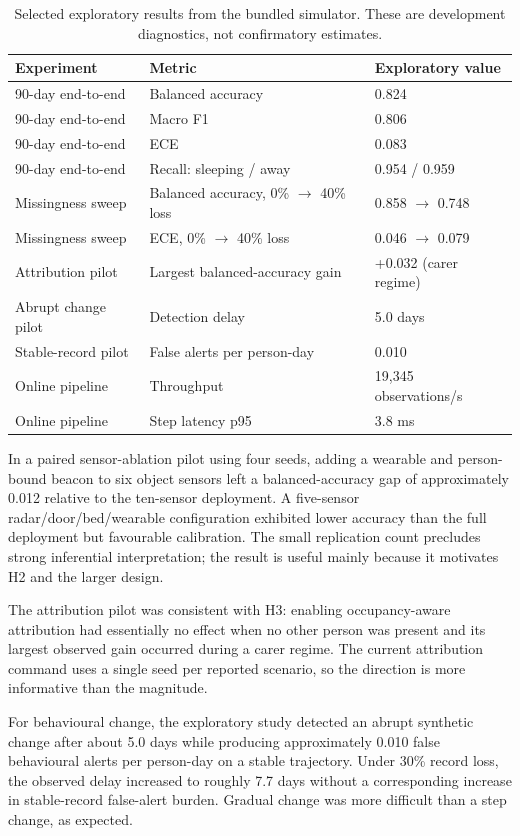 \documentclass[11pt]{article}
\begin{document}
\begin{table}[t]
\centering
\caption{Selected exploratory results from the bundled simulator. These are development diagnostics, not confirmatory estimates.}
\label{tab:pilot}
\begin{tabular}{lll}
\toprule
Experiment & Metric & Exploratory value \\
\midrule
90-day end-to-end & Balanced accuracy & 0.824 \\
90-day end-to-end & Macro F1 & 0.806 \\
90-day end-to-end & ECE & 0.083 \\
90-day end-to-end & Recall: sleeping / away & 0.954 / 0.959 \\
Missingness sweep & Balanced accuracy, 0\% $\rightarrow$ 40\% loss & 0.858 $\rightarrow$ 0.748 \\
Missingness sweep & ECE, 0\% $\rightarrow$ 40\% loss & 0.046 $\rightarrow$ 0.079 \\
Attribution pilot & Largest balanced-accuracy gain & +0.032 (carer regime) \\
Abrupt change pilot & Detection delay & 5.0 days \\
Stable-record pilot & False alerts per person-day & 0.010 \\
Online pipeline & Throughput & 19,345 observations/s \\
Online pipeline & Step latency p95 & 3.8 ms \\
\bottomrule
\end{tabular}
\end{table}

In a paired sensor-ablation pilot using four seeds, adding a wearable and person-bound beacon to six object sensors left a balanced-accuracy gap of approximately 0.012 relative to the ten-sensor deployment. A five-sensor radar/door/bed/wearable configuration exhibited lower accuracy than the full deployment but favourable calibration. The small replication count precludes strong inferential interpretation; the result is useful mainly because it motivates H2 and the larger design.

The attribution pilot was consistent with H3: enabling occupancy-aware attribution had essentially no effect when no other person was present and its largest observed gain occurred during a carer regime. The current attribution command uses a single seed per reported scenario, so the direction is more informative than the magnitude.

For behavioural change, the exploratory study detected an abrupt synthetic change after about 5.0 days while producing approximately 0.010 false behavioural alerts per person-day on a stable trajectory. Under 30\% record loss, the observed delay increased to roughly 7.7 days without a corresponding increase in stable-record false-alert burden. Gradual change was more difficult than a step change, as expected.
\end{document}
